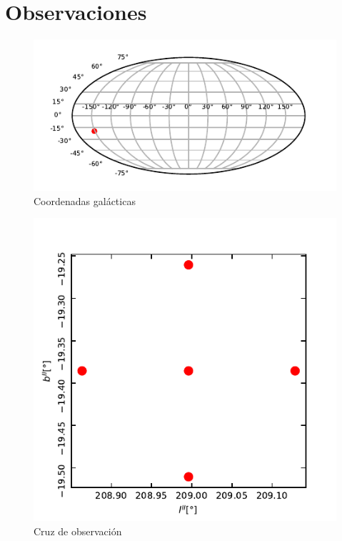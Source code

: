 \section{Observaciones}

\begin{figure}[htbp]
	\centering
	\includegraphics{lb.pdf}
	\caption{Coordenadas galácticas}
	\label{fig:lb}
\end{figure}

\begin{figure}[htbp]
	\centering
	\includegraphics{cruz.pdf}
	\caption{Cruz de observación}
	\label{fig:cruz}
\end{figure}

